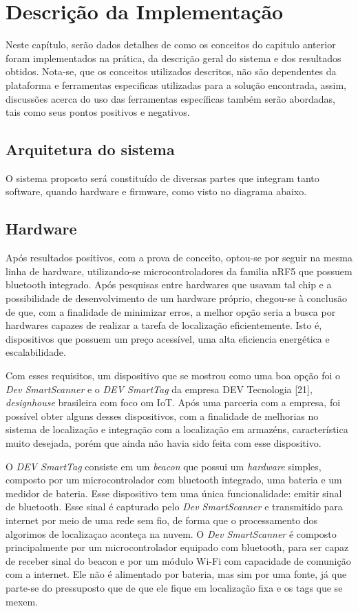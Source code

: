 \chapter{Descrição da Implementação}
Neste capítulo, serão dados detalhes de como os conceitos do capitulo anterior foram implementados na prática, da descrição geral do sistema e dos resultados obtidos.
Nota-se, que os conceitos utilizados descritos, não são dependentes da plataforma e ferramentas especificas utilizadas para a solução encontrada, assim, discussões acerca do uso das ferramentas específicas também serão abordadas, tais como seus pontos positivos e negativos.


\section{Arquitetura do sistema}
O sistema proposto será constituído de diversas partes que integram tanto software, quando hardware e firmware, como visto no diagrama abaixo.

\section{Hardware}
Após resultados positivos, com a prova de conceito, optou-se por seguir na mesma linha de hardware, utilizando-se microcontroladores da familia nRF5 que possuem bluetooth integrado. Após pesquisas entre hardwares que usavam tal chip e a possibilidade de desenvolvimento de um hardware próprio, chegou-se à conclusão de que, com a finalidade de minimizar erros, a melhor opção seria a busca por hardwares capazes de realizar a tarefa de localização eficientemente. Isto é, dispositivos que possuem um preço acessível, uma alta eficiencia energética e escalabilidade.

Com esses requisitos, um dispositivo que se mostrou como uma boa opção foi o \textit{Dev SmartScanner} e o \textit{DEV SmartTag} da empresa DEV Tecnologia [21], \textit{designhouse} brasileira com foco om IoT. Após uma parceria com a empresa, foi possível obter alguns desses dispositivos, com a finalidade de melhorias no sistema de localização e integração com a localização em armazéns, característica muito desejada, porém que ainda não havia sido feita com esse dispositivo.

O \textit{DEV SmartTag} consiste em um \textit{beacon} que possui um \textit{hardware} simples, composto por um microcontrolador com bluetooth integrado, uma bateria e um medidor de bateria. Esse dispositivo tem uma única funcionalidade: emitir sinal de bluetooth.
Esse sinal é capturado pelo \textit{Dev SmartScanner} e transmitido para internet por meio de uma rede sem fio, de forma que o processamento dos algorimos de localizaçao aconteça na nuvem. O \textit{Dev SmartScanner} é composto principalmente por um microcontrolador equipado com bluetooth, para ser capaz de receber sinal do beacon e por um módulo Wi-Fi com capacidade de comunição com a internet. Ele não é alimentado por bateria, mas sim por uma fonte, já que  parte-se do pressuposto que de que ele fique em localização fixa e os tags que se mexem.

